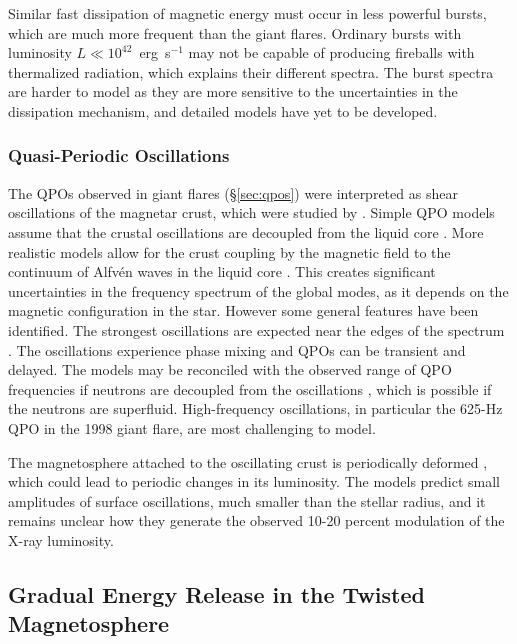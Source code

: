 Similar fast dissipation of magnetic energy must occur in less powerful bursts,
which are much more frequent than the giant flares. Ordinary bursts with 
luminosity $L\ll 10^{42}$~erg~s$^{-1}$ may not be capable of producing 
fireballs with thermalized radiation, which explains their different spectra. 
The burst spectra are harder to model as they are more sensitive to the uncertainties 
in the dissipation mechanism, and detailed models have yet to be developed.


\subsubsection{Quasi-Periodic Oscillations}


The QPOs observed in giant flares (\S\ref{sec:qpos})
were interpreted as shear oscillations of the magnetar crust, which were studied by 
\citet{dun98}.
Simple QPO models assume that the crustal oscillations are decoupled
from the liquid core \citep{pir05,sa07}.
More realistic models allow for the crust coupling by the magnetic field
to the continuum of Alfv\'en waves in the liquid core
\citep{lev07}.
This creates significant uncertainties in the frequency spectrum of the global modes, 
as it depends on the magnetic configuration in the star. However some general 
features have been identified. 
The strongest oscillations are expected near the edges of the spectrum \citep{vl11}. 
The oscillations experience phase mixing and QPOs can be transient and delayed.
The models may be reconciled with the observed range of QPO frequencies
if neutrons are decoupled from the oscillations \citep{vl11,gcs+13,pl14},
which is possible if the neutrons are superfluid. 
High-frequency oscillations, in particular the 625-Hz QPO in the 1998 giant flare,
are most challenging to model. 

The magnetosphere attached to the oscillating crust is periodically
deformed \citep{gcs+14}, which could lead to periodic changes in its luminosity. 
The models predict small amplitudes of surface oscillations, much smaller 
than the stellar radius, and it remains unclear how they generate the 
observed 10-20 percent modulation of the X-ray luminosity.



\subsection{Gradual Energy Release in the Twisted Magnetosphere}
\label{sec:twist}


